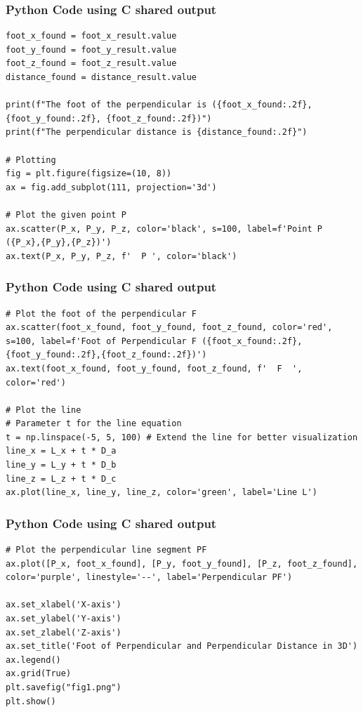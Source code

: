 \documentclass{beamer}
\begin{document}
\begin{frame}[fragile]
\frametitle{Python Code using C shared output}
\begin{lstlisting}
foot_x_found = foot_x_result.value
foot_y_found = foot_y_result.value
foot_z_found = foot_z_result.value
distance_found = distance_result.value

print(f"The foot of the perpendicular is ({foot_x_found:.2f}, {foot_y_found:.2f}, {foot_z_found:.2f})")
print(f"The perpendicular distance is {distance_found:.2f}")

# Plotting
fig = plt.figure(figsize=(10, 8))
ax = fig.add_subplot(111, projection='3d')

# Plot the given point P
ax.scatter(P_x, P_y, P_z, color='black', s=100, label=f'Point P ({P_x},{P_y},{P_z})')
ax.text(P_x, P_y, P_z, f'  P ', color='black')
\end{lstlisting}
\end{frame}

\begin{frame}[fragile]
\frametitle{Python Code using C shared output}
\begin{lstlisting}
# Plot the foot of the perpendicular F
ax.scatter(foot_x_found, foot_y_found, foot_z_found, color='red', s=100, label=f'Foot of Perpendicular F ({foot_x_found:.2f},{foot_y_found:.2f},{foot_z_found:.2f})')
ax.text(foot_x_found, foot_y_found, foot_z_found, f'  F  ', color='red')

# Plot the line
# Parameter t for the line equation
t = np.linspace(-5, 5, 100) # Extend the line for better visualization
line_x = L_x + t * D_a
line_y = L_y + t * D_b
line_z = L_z + t * D_c
ax.plot(line_x, line_y, line_z, color='green', label='Line L')
\end{lstlisting}
\end{frame}

\begin{frame}[fragile]
\frametitle{Python Code using C shared output}
\begin{lstlisting}
# Plot the perpendicular line segment PF
ax.plot([P_x, foot_x_found], [P_y, foot_y_found], [P_z, foot_z_found], color='purple', linestyle='--', label='Perpendicular PF')

ax.set_xlabel('X-axis')
ax.set_ylabel('Y-axis')
ax.set_zlabel('Z-axis')
ax.set_title('Foot of Perpendicular and Perpendicular Distance in 3D')
ax.legend()
ax.grid(True)
plt.savefig("fig1.png")
plt.show()
\end{lstlisting}
\end{frame}
\end{document}
